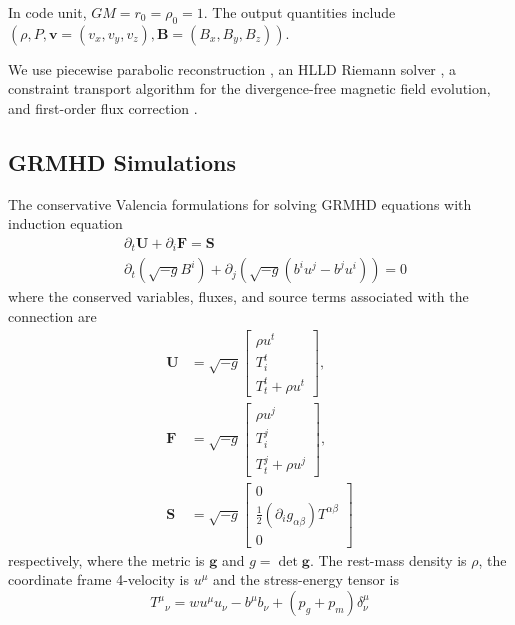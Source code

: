 \documentclass[%
 reprint,
 superscriptaddress,
 amsmath,amssymb,
 nofootinbib,
 prd,
]{revtex4-2}
\begin{document}
In code unit, $GM=r_0=\rho_0=1$. The output quantities include $(\rho, P, \boldsymbol{v}=(v_x, v_y, v_z), \boldsymbol{B}=(B_x, B_y, B_z))$.

We use piecewise parabolic reconstruction \citep{Colella1984}, an HLLD Riemann solver \citep{Miyoshi2005},  a constraint transport algorithm \citep{Gardiner2008} for the divergence-free magnetic field evolution, and first-order flux correction \cite{2009ApJ...691.1092L}.

\subsection{GRMHD Simulations}
The conservative Valencia formulations for solving GRMHD equations with induction equation
\begin{align}
     &\partial_t\boldsymbol{U} + \partial_i\boldsymbol{F}=\boldsymbol{S} \\
     &\partial_t (\sqrt{-g}B^i)+\partial_j(\sqrt{-g}(b^iu^j-b^ju^i))=0
\end{align}
where the conserved variables, fluxes, and source terms associated with the connection are
\begin{equation}
\begin{aligned}
\mathbf{U} &=\sqrt{-g}\left[\begin{array}{c}
\rho u^t \\
T_i^t \\
T_t^t+\rho u^t
\end{array}\right], \\
\mathbf{F} &=\sqrt{-g}\left[\begin{array}{c}
\rho u^j \\
T_i^j \\
T_t^j+\rho u^j
\end{array}\right], \\
\mathbf{S} & =\sqrt{-g}\left[\begin{array}{c}
0 \\
\frac{1}{2}\left(\partial_i g_{\alpha \beta}\right) T^{\alpha \beta} \\
0
\end{array}\right]
\end{aligned}
\end{equation}
respectively, where the metric is $\boldsymbol{g}$ and $g=\det{\boldsymbol{g}}$. The rest-mass density is $\rho$, the coordinate frame 4-velocity is $u^\mu$ and the stress-energy tensor is 
\begin{equation}
    {T^\mu}_{\nu} = w u^\mu u_\nu-b^\mu b_\nu + (p_g+p_m)\delta^\mu_\nu
\end{equation}
\end{document}
